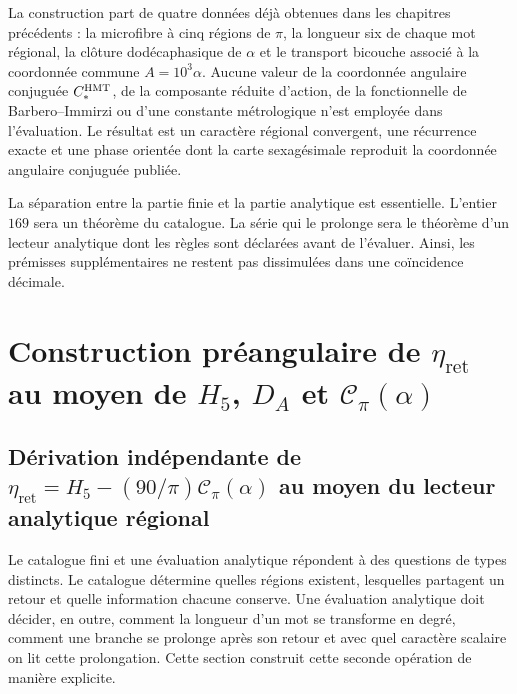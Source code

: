 La construction part de quatre données déjà obtenues dans les chapitres
précédents : la microfibre à cinq régions de \(\pi\), la longueur six de
chaque mot régional, la clôture dodécaphasique de \(\alpha\) et le transport
bicouche associé à la coordonnée commune
\(A=10^3\alpha\). Aucune valeur de la coordonnée angulaire conjuguée \(C_*^{\rm HMT}\), de la composante réduite
d'action, de la fonctionnelle de Barbero--Immirzi ou d'une constante métrologique n'est
employée dans l'évaluation. Le résultat est un caractère régional convergent,
une récurrence exacte et une phase orientée dont la carte sexagésimale reproduit
la coordonnée angulaire conjuguée publiée.

La séparation entre la partie finie et la partie analytique est essentielle. L'entier
\(169\) sera un théorème du catalogue. La série qui le prolonge sera le
théorème d'un lecteur analytique dont les règles sont déclarées avant de l'évaluer.
Ainsi, les prémisses supplémentaires ne restent pas dissimulées dans une coïncidence
décimale.

\section{Construction préangulaire de \texorpdfstring{\(\eta_{\mathrm{ret}}\)}{eta_ret} au moyen de \texorpdfstring{\(H_5\)}{H5}, \texorpdfstring{\(D_A\)}{D_A} et \texorpdfstring{\(\mathscr C_\pi(\alpha)\)}{C_pi(alpha)}}
\label{sec:s102:c38:2}

\subsection{Dérivation indépendante de \texorpdfstring{\(\eta_{\mathrm{ret}}=H_5-(90/\pi)\mathscr C_\pi(\alpha)\)}{eta_ret=H5-(90/pi)C_pi(alpha)} au moyen du lecteur analytique régional}
\label{sec:s102:c38:2:1}


Le catalogue fini et une évaluation analytique répondent à des questions de types
distincts. Le catalogue détermine quelles régions existent, lesquelles partagent un
retour et quelle information chacune conserve. Une évaluation analytique doit
décider, en outre, comment la longueur d'un mot se transforme en degré, comment
une branche se prolonge après son retour et avec quel caractère scalaire on lit
cette prolongation. Cette section construit cette seconde opération de manière
explicite.


